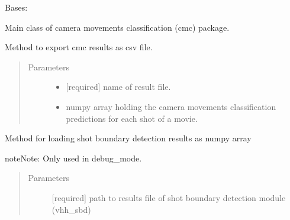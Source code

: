 \documentclass[letterpaper,10pt,english]{sphinxmanual}
\begin{document}
\begin{fulllineitems}
\label{\detokenize{CMC:cmc.CMC.CMC}}
Bases: 

Main class of camera movements classification (cmc) package.

\begin{fulllineitems}
\label{\detokenize{CMC:cmc.CMC.CMC.exportCmcResults}}
Method to export cmc results as csv file.
\begin{quote}\begin{description}
\item[{Parameters}] \leavevmode\begin{itemize}
\item {} 
 \textendash{} {[}required{]} name of result file.

\item {} 
 \textendash{} numpy array holding the camera movements classification predictions for each shot of a movie.

\end{itemize}

\end{description}\end{quote}

\end{fulllineitems}


\begin{fulllineitems}
\label{\detokenize{CMC:cmc.CMC.CMC.loadSbdResults}}
Method for loading shot boundary detection results as numpy array

\begin{sphinxadmonition}{note}{Note:}
Only used in debug\_mode.
\end{sphinxadmonition}
\begin{quote}\begin{description}
\item[{Parameters}] \leavevmode
{} \textendash{} {[}required{]} path to results file of shot boundary detection module (vhh\_sbd)


\end{description}
\end{quote}
\end{fulllineitems}
\end{fulllineitems}
\end{document}
